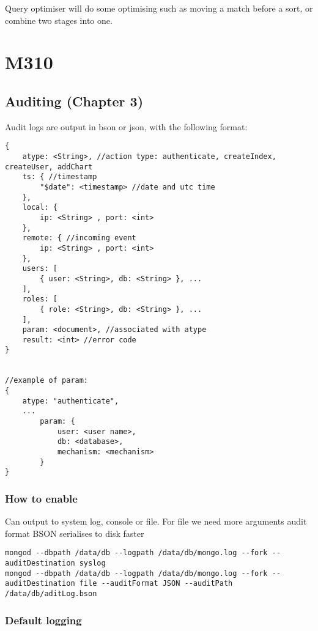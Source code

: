 \documentclass[11pt]{article}
\begin{document}
Query optimiser will do some optimising such as moving a match before a sort, or combine two stages into one.



\section{M310}
\label{sec:org145fb84}

\subsection{Auditing (Chapter 3)}
\label{sec:org0388abf}

Audit logs are output in bson or json, with the following format:

\begin{verbatim}
{
    atype: <String>, //action type: authenticate, createIndex, createUser, addChart
    ts: { //timestamp
        "$date": <timestamp> //date and utc time
    },
    local: {
        ip: <String> , port: <int>
    },
    remote: { //incoming event
        ip: <String> , port: <int>
    },
    users: [
        { user: <String>, db: <String> }, ...
    ],
    roles: [
        { role: <String>, db: <String> }, ...
    ],
    param: <document>, //associated with atype
    result: <int> //error code
}


//example of param:
{
    atype: "authenticate",
    ...
        param: {
            user: <user name>,
            db: <database>,
            mechanism: <mechanism>
        }
}
\end{verbatim}

\subsubsection{How to enable}
\label{sec:org16b7043}

Can output to system log, console or file. For file we need more arguments
audit format BSON serialises to disk faster

\begin{verbatim}
mongod --dbpath /data/db --logpath /data/db/mongo.log --fork --auditDestination syslog
mongod --dbpath /data/db --logpath /data/db/mongo.log --fork --auditDestination file --auditFormat JSON --auditPath /data/db/aditLog.bson
\end{verbatim}

\subsubsection{Default logging}
\label{sec:org4e154bd}
\end{document}
